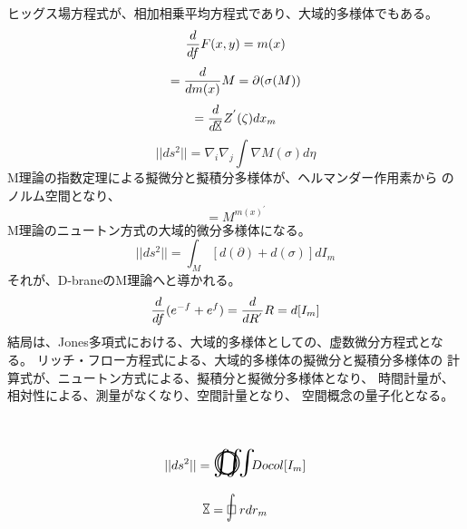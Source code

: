 \documentclass{jsarticle}
\begin{document}
     ヒッグス場方程式が、相加相乗平均方程式であり、大域的多様体でもある。
  $$ {d \over {df}}F(x,y)=m(x) $$
  $$ = {d \over {d m(x)}}M = \partial (\sigma(M)) $$
  $$=  {d \over {d \timebow}}Z^{'}(\zeta)dx_m $$
  $$ ||ds^2|| = \nabla_{i}\nabla_{j}\int \nabla M(\sigma)d\eta $$
  M理論の指数定理による擬微分と擬積分多様体が、ヘルマンダー作用素から
  のノルム空間となり、
  $$ = M^{{m(x)^{'}}} $$
  M理論のニュートン方式の大域的微分多様体になる。
  $$ ||ds^2|| = \int_M [d(\partial) + d(\sigma)]dI_m $$
  それが、D-braneのM理論へと導かれる。
  $$ {d \over {df}}(e^{-f} + e^{f}) = {{d \over {d R^{'}}}}R = d[I_m] $$
  結局は、Jones多項式における、大域的多様体としての、虚数微分方程式となる。
  リッチ・フロー方程式による、大域的多様体の擬微分と擬積分多様体の
  計算式が、ニュートン方式による、擬積分と擬微分多様体となり、
  時間計量が、相対性による、測量がなくなり、空間計量となり、
  空間概念の量子化となる。
$$ ||ds^2|| = \whitewithbodercircleiiint Docol[I_m] $$

 	
$$ \timebow = \flowerletter r dr_m $$
\end{document}
